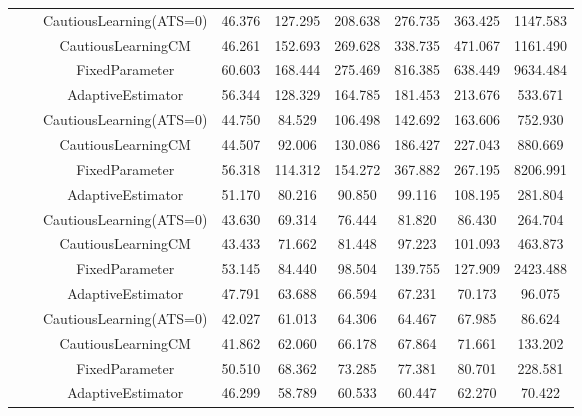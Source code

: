 \begin{table}[!h]
\begin{tabular}[t]{ccccccccc}
 &  & CautiousLearning(ATS=0) & 46.376 & 127.295 & 208.638 & 276.735 & 363.425 & 1147.583\\

 &  & CautiousLearningCM & 46.261 & 152.693 & 269.628 & 338.735 & 471.067 & 1161.490\\

 & \multirow[t]{-4}{*}{\centering\arraybackslash 0.25} & FixedParameter & 60.603 & 168.444 & 275.469 & 816.385 & 638.449 & 9634.484\\
\cmidrule{2-9}
 &  & AdaptiveEstimator & 56.344 & 128.329 & 164.785 & 181.453 & 213.676 & 533.671\\

 &  & CautiousLearning(ATS=0) & 44.750 & 84.529 & 106.498 & 142.692 & 163.606 & 752.930\\

 &  & CautiousLearningCM & 44.507 & 92.006 & 130.086 & 186.427 & 227.043 & 880.669\\

 & \multirow[t]{-4}{*}{\centering\arraybackslash 0.35} & FixedParameter & 56.318 & 114.312 & 154.272 & 367.882 & 267.195 & 8206.991\\
\cmidrule{2-9}
 &  & AdaptiveEstimator & 51.170 & 80.216 & 90.850 & 99.116 & 108.195 & 281.804\\

 &  & CautiousLearning(ATS=0) & 43.630 & 69.314 & 76.444 & 81.820 & 86.430 & 264.704\\

 &  & CautiousLearningCM & 43.433 & 71.662 & 81.448 & 97.223 & 101.093 & 463.873\\

 & \multirow[t]{-4}{*}{\centering\arraybackslash 0.50} & FixedParameter & 53.145 & 84.440 & 98.504 & 139.755 & 127.909 & 2423.488\\
\cmidrule{2-9}
 &  & AdaptiveEstimator & 47.791 & 63.688 & 66.594 & 67.231 & 70.173 & 96.075\\

 &  & CautiousLearning(ATS=0) & 42.027 & 61.013 & 64.306 & 64.467 & 67.985 & 86.624\\

 &  & CautiousLearningCM & 41.862 & 62.060 & 66.178 & 67.864 & 71.661 & 133.202\\

 & \multirow[t]{-4}{*}{\centering\arraybackslash 0.75} & FixedParameter & 50.510 & 68.362 & 73.285 & 77.381 & 80.701 & 228.581\\
\cmidrule{2-9}
 &  & AdaptiveEstimator & 46.299 & 58.789 & 60.533 & 60.447 & 62.270 & 70.422\\


\end{tabular}
\end{table}

